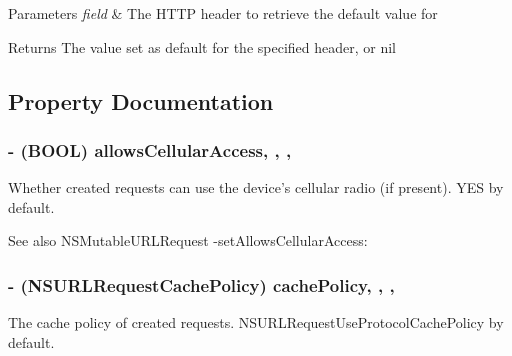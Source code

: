 \begin{DoxyParams}{Parameters}
{\em field} & The H\+T\+T\+P header to retrieve the default value for\\
\hline
\end{DoxyParams}
\begin{DoxyReturn}{Returns}
The value set as default for the specified header, or {\ttfamily nil} 
\end{DoxyReturn}


\subsection{Property Documentation}
\hypertarget{interface_a_f_h_t_t_p_request_serializer_ad1e2a4f25d1f250c8a702c3b0d9e6a8b}{}
\subsubsection[{allows\+Cellular\+Access}]{\setlength{\rightskip}{0pt plus 5cm}-\/ (B\+O\+O\+L) allows\+Cellular\+Access\hspace{0.3cm}{\ttfamily [read]}, {\ttfamily [write]}, {\ttfamily [nonatomic]}, {\ttfamily [assign]}}\label{interface_a_f_h_t_t_p_request_serializer_ad1e2a4f25d1f250c8a702c3b0d9e6a8b}
Whether created requests can use the device’s cellular radio (if present). {\ttfamily Y\+E\+S} by default.

\begin{DoxySeeAlso}{See also}
N\+S\+Mutable\+U\+R\+L\+Request -\/set\+Allows\+Cellular\+Access\+: 
\end{DoxySeeAlso}
\hypertarget{interface_a_f_h_t_t_p_request_serializer_ace509f9a4a7798cee965d6d0939196a7}{}
\subsubsection[{cache\+Policy}]{\setlength{\rightskip}{0pt plus 5cm}-\/ (N\+S\+U\+R\+L\+Request\+Cache\+Policy) cache\+Policy\hspace{0.3cm}{\ttfamily [read]}, {\ttfamily [write]}, {\ttfamily [nonatomic]}, {\ttfamily [assign]}}\label{interface_a_f_h_t_t_p_request_serializer_ace509f9a4a7798cee965d6d0939196a7}
The cache policy of created requests. {\ttfamily N\+S\+U\+R\+L\+Request\+Use\+Protocol\+Cache\+Policy} by default.

